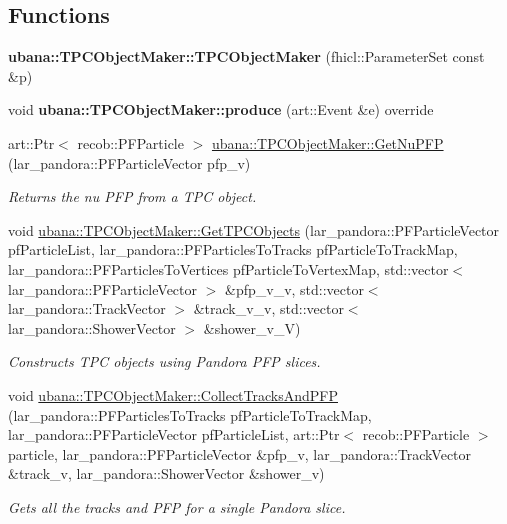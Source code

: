 \subsection*{\-Functions}
\begin{DoxyCompactItemize}
\item 
\hypertarget{group__UBXSec_gae030804e6aa4085bef6be52e9618fee9}{{\bfseries ubana\-::\-T\-P\-C\-Object\-Maker\-::\-T\-P\-C\-Object\-Maker} (fhicl\-::\-Parameter\-Set const \&p)}\label{group__UBXSec_gae030804e6aa4085bef6be52e9618fee9}

\item 
\hypertarget{group__UBXSec_ga07c03a811bbaccdbeb20b2b7714034c9}{void {\bfseries ubana\-::\-T\-P\-C\-Object\-Maker\-::produce} (art\-::\-Event \&e) override}\label{group__UBXSec_ga07c03a811bbaccdbeb20b2b7714034c9}

\item 
art\-::\-Ptr$<$ recob\-::\-P\-F\-Particle $>$ \hyperlink{group__UBXSec_ga6a47470b5f5690a3626e14bc9f6f360c}{ubana\-::\-T\-P\-C\-Object\-Maker\-::\-Get\-Nu\-P\-F\-P} (lar\-\_\-pandora\-::\-P\-F\-Particle\-Vector pfp\-\_\-v)
\begin{DoxyCompactList}\small\item\em \-Returns the nu \-P\-F\-P from a \-T\-P\-C object. \end{DoxyCompactList}\item 
void \hyperlink{group__UBXSec_ga3a6d9a4eca7f0c83bb118e01f5a00505}{ubana\-::\-T\-P\-C\-Object\-Maker\-::\-Get\-T\-P\-C\-Objects} (lar\-\_\-pandora\-::\-P\-F\-Particle\-Vector pf\-Particle\-List, lar\-\_\-pandora\-::\-P\-F\-Particles\-To\-Tracks pf\-Particle\-To\-Track\-Map, lar\-\_\-pandora\-::\-P\-F\-Particles\-To\-Vertices pf\-Particle\-To\-Vertex\-Map, std\-::vector$<$ lar\-\_\-pandora\-::\-P\-F\-Particle\-Vector $>$ \&pfp\-\_\-v\-\_\-v, std\-::vector$<$ lar\-\_\-pandora\-::\-Track\-Vector $>$ \&track\-\_\-v\-\_\-v, std\-::vector$<$ lar\-\_\-pandora\-::\-Shower\-Vector $>$ \&shower\-\_\-v\-\_\-\-V)
\begin{DoxyCompactList}\small\item\em \-Constructs \-T\-P\-C objects using \-Pandora \-P\-F\-P slices. \end{DoxyCompactList}\item 
void \hyperlink{group__UBXSec_ga0550ab0459c2d42ff81eb349d4b4151a}{ubana\-::\-T\-P\-C\-Object\-Maker\-::\-Collect\-Tracks\-And\-P\-F\-P} (lar\-\_\-pandora\-::\-P\-F\-Particles\-To\-Tracks pf\-Particle\-To\-Track\-Map, lar\-\_\-pandora\-::\-P\-F\-Particle\-Vector pf\-Particle\-List, art\-::\-Ptr$<$ recob\-::\-P\-F\-Particle $>$ particle, lar\-\_\-pandora\-::\-P\-F\-Particle\-Vector \&pfp\-\_\-v, lar\-\_\-pandora\-::\-Track\-Vector \&track\-\_\-v, lar\-\_\-pandora\-::\-Shower\-Vector \&shower\-\_\-v)
\begin{DoxyCompactList}\small\item\em \-Gets all the tracks and \-P\-F\-P for a single \-Pandora slice. \end{DoxyCompactList}\end{DoxyCompactItemize}
